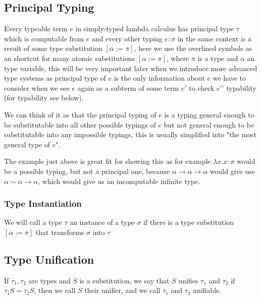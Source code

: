 \subsection{Principal Typing}

Every typeable term $e$ in simply-typed lambda calculus has principal type $\tau$ which is computable from $e$ and every other typing
$e : \sigma$ in the same context is a result of some type substitution $[\overline{\alpha} := \overline{\pi}]$, here we use the overlined symbols
as an shortcut for many atomic substitutions $[\alpha := \pi]$, where $\pi$ is a type and $\alpha$ an type variable, this will be very important
later when we introduce more advanced type systems as principal type of $e$ is the only information about $e$ we have to consider
when we see $e$ again as a subterm of some term $e'$ to check $e'$' typability (for typability see below). %

We can think of it as that the principal typing of $e$ is a typing general enough to be substitutable into all other possible typings of $e$
but not general enough to be substitutable into any impossible typings, this is usually simplified into "the most general type of $e$". %

The example just above %
is great fit for showing this as for example $\lambda x . x : \sigma$ would be a possible typing, but not a principal one, because
$\alpha \rightarrow \alpha \rightarrow \alpha$ would give use $\alpha \sim \alpha \rightarrow \alpha$, which would give us an incomputable
infinite type.

\subsubsection{Type Instantiation}

We will call a type $\tau$ an instance of a type $\sigma$ if there is a type substitution $[\overline{\alpha} := \overline{\pi}]$
that transforms $\sigma$ into $\tau$ %

\subsection{Type Unification}

If $\tau_1, \tau_2$ are types and $S$ is a substitution, we say that $S$ unifies
$\tau_1$ and $\tau_2$ if $\tau_1 S = \tau_2 S$, then we call $S$ their unifier, and we call $\tau_1$ and $\tau_2$ unifiable. %

